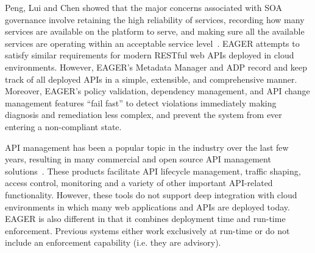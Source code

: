 Peng, Lui and Chen showed that
the major concerns associated with SOA governance 
involve retaining the high reliability of services, recording how many services
are available on the platform to serve, and making sure all the available 
services are operating within an acceptable service
level~\cite{4730489}. EAGER attempts to satisfy similar requirements for 
modern RESTful web APIs deployed in cloud environments. 
However, EAGER's Metadata Manager and ADP record and keep track of all deployed APIs 
in a simple, extensible, and comprehensive manner.  Moreover, EAGER's policy
validation, dependency management, and API change management features 
``fail fast'' to detect violations immediately making
diagnosis and remediation less complex, and prevent
the system from ever entering a non-compliant state.

API management has been a popular topic in the industry over the last few years, resulting
in many commercial and open source API management solutions~\cite{wso2am,apigee,layer7,mashery}. These products facilitate
API lifecycle management, traffic shaping, access control, monitoring and a variety of other
important API-related functionality. However, these tools do not support deep integration with
cloud environments in which many web applications and APIs are deployed today. 
EAGER is also different in that it combines deployment time and run-time
enforcement.  Previous systems either work exclusively at run-time or do not
include an enforcement capability (i.e. they are advisory).
%
